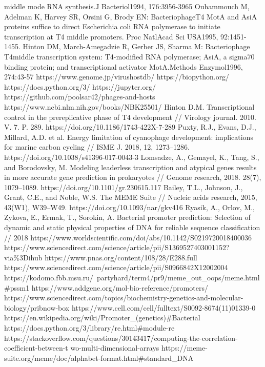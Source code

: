 \documentclass[14pt]{extarticle}
\begin{document}
\begin{thebibliography}{9}
    middle mode RNA synthesis.J  Bacteriol1994, 176:3956-3965
     Ouhammouch M, Adelman K, Harvey SR, Orsini G, Brody EN: BacteriophageT4 MotA and AsiA proteins 
    suffice to direct Escherichia coli RNA polymerase to initiate transcription at T4 middle promoters. Proc  NatlAcad  
    Sci  USA1995, 92:1451-1455.
     Hinton DM, March-Amegadzie R, Gerber JS, Sharma M: Bacteriophage T4middle transcription system: 
    T4-modified RNA polymerase; AsiA, a sigma70 binding protein; and transcriptional activator MotA.Methods  
    Enzymol1996, 274:43-57
     https://www.genome.jp/virushostdb/ 
     https://biopython.org/
     https://docs.python.org/3/
     https://jupyter.org/
     https://github.com/poolsar42/phages-and-hosts
     https://www.ncbi.nlm.nih.gov/books/NBK25501/
     Hinton D.M. Transcriptional control in the prereplicative phase of T4 development // Virology
    journal. 2010. V. 7. P. 289. https://doi.org/10.1186/1743-422X-7-289
     Puxty, R.J., Evans, D.J., Millard, A.D. et al. Energy limitation of cyanophage development:
    implications for marine carbon cycling // ISME J. 2018, 12, 1273–1286. https://doi.org/10.1038/s41396-017-0043-3
     Lomsadze, A., Gemayel, K., Tang, S., and Borodovsky, M. Modeling leaderless transcription and
    atypical genes results in more accurate gene prediction in prokaryotes // Genome research,  2018. 28(7), 1079–1089.
    https://doi.org/10.1101/gr.230615.117
     Bailey, T.L., Johnson, J., Grant, C.E., and Noble, W.S. The MEME Suite // Nucleic acids research,
    2015, 43(W1), W39–W49. https://doi.org/10.1093/nar/gkv416
     Ryasik, A., Orlov, M., Zykova, E., Ermak, T., Sorokin, A. Bacterial promoter prediction: Selection
    of dynamic and static physical properties of DNA for reliable sequence classification // 2018
    https://www.worldscientific.com/doi/abs/10.1142/S0219720018400036
     https://www.sciencedirect.com/science/article/pii/S1369527403001152?via\%3Dihub
     https://www.pnas.org/content/108/28/E288.full
     https://www.sciencedirect.com/science/article/pii/S0966842X12002004
     https://kodomo.fbb.msu.ru/~partyhard/term4/pr9/meme\_out\_oops/meme.html\#pssm1
     https://www.addgene.org/mol-bio-reference/promoters/
     https://www.sciencedirect.com/topics/biochemistry-genetics-and-molecular-biology/pribnow-box
     https://www.cell.com/cell/fulltext/S0092-8674(11)01339-0
     https://en.wikipedia.org/wiki/Promoter\_(genetics)\#Bacterial
     https://docs.python.org/3/library/re.html\#module-re
     https://stackoverflow.com/questions/30143417/computing-the-correlation-coefficient-between-t
    wo-multi-dimensional-arrays
     https://meme-suite.org/meme/doc/alphabet-format.html\#standard\_DNA
\end{thebibliography}
\end{document}
